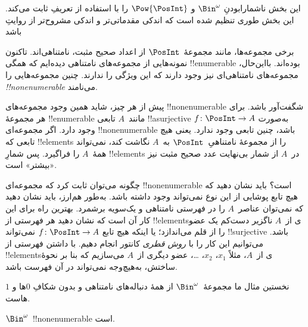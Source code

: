 \documentclass[../../../include/open-logic-section]{subfiles}
\begin{document}


\begin{editorial}
  این بخش ناشمارابودنِ $\Bin^\omega$ و $\Pow{\PosInt}$ را با استفاده
  از تعریفِ  ثابت می‌کند. این بخش طوری
  تنظیم شده است که اندکی مقدماتی‌تر و اندکی مشروح‌تر از روایتِ
   باشد
\end{editorial}

برخی مجموعه‌ها، مانند مجموعهٔ~$\PosInt$ از اعداد صحیح مثبت،
نامتناهی‌اند. تاکنون نمونه‌هایی از مجموعه‌های نامتناهی دیده‌ایم که همگی
!!{enumerable} بوده‌اند. بااین‌حال، مجموعه‌های نامتناهی‌ای نیز وجود دارند
که این ویژگی را ندارند. چنین مجموعه‌هایی را \emph{!!{nonenumerable}}
می‌نامند.

پیش از هر چیز، شاید همین وجود مجموعه‌های !!{nonenumerable} شگفت‌آور
باشد. برای هر مجموعهٔ !!{enumerable} مانند~$A$ تابعی !!a{surjective}
به‌صورت $f \colon \PosInt \to A$ وجود دارد. اگر مجموعه‌ای
!!{nonenumerable} باشد، چنین تابعی وجود ندارد. یعنی هیچ تابعی که
!!{element}s را از مجموعهٔ نامتناهیِ~$\PosInt$ به~$A$ نگاشت کند،
نمی‌تواند همهٔ~$A$ را فراگیرد. پس شمارِ !!{element}s در~$A$ از شمار
بی‌نهایت عدد صحیح مثبت نیز «بیشتر» است.

چگونه می‌توان ثابت کرد که مجموعه‌ای !!{nonenumerable} است؟ باید نشان
دهید که هیچ تابع پوشایی از این نوع نمی‌تواند وجود داشته باشد. به‌طور
هم‌ارز، باید نشان دهید که نمی‌توان عناصر~$A$ را در فهرستی نامتناهی و
یک‌سویه برشمرد. بهترین راه برای این کار آن است که نشان دهید هر فهرستی
از !!{element}sی از~$A$ ناگزیر دست‌کم یک عضو را از قلم می‌اندازد؛ یا
اینکه هیچ تابع $f\colon \PosInt \to A$ نمی‌تواند !!{surjective} باشد.
می‌توانیم این کار را با \emph{روش قطری} کانتور انجام دهیم. با داشتن
فهرستی از !!{element}sی از~$A$، مثلاً $x_1$، $x_2$، \dots، عضو دیگری
از~$A$ می‌سازیم که بنا بر نحوهٔ ساختش، به‌هیچ‌وجه نمی‌تواند در آن
فهرست باشد.

نخستین مثال ما مجموعهٔ~$\Bin^\omega$ از همهٔ دنباله‌های نامتناهی و
بدون شکافِ $0$ها و $1$هاست.

\begin{thm}
$\Bin^\omega$~!!{nonenumerable} است.
\end{thm}
\end{document}
